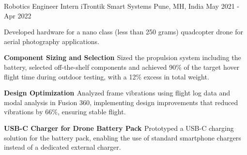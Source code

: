 \begin{work}
  {Robotics Engineer Intern}
  {iTrontik Smart Systems}
  {Pune, MH, India}
  {May 2021 - Apr 2022}

  \item Developed hardware for a nano class (less than 250 grams) quadcopter drone for aerial
        photography applications.

  \item {\bf\textcolor{gray-2}{Component Sizing and Selection }} Sized the propulsion system
        including the battery, selected off-the-shelf components and achieved 90\% of the target
        hover flight time during outdoor testing, with a 12\% excess in total weight.

  \item {\bf\textcolor{gray-2}{Design Optimization }} Analyzed frame vibrations using flight log
        data and modal analysis in Fusion 360, implementing design improvements that reduced
        vibrations by 66\%, ensuring stable flight.

  \item {\bf\textcolor{gray-2}{USB-C Charger for Drone Battery Pack }} Prototyped a USB-C charging
        solution for the battery pack, enabling the use of standard smartphone chargers instead of
        a dedicated external charger.

\end{work}
